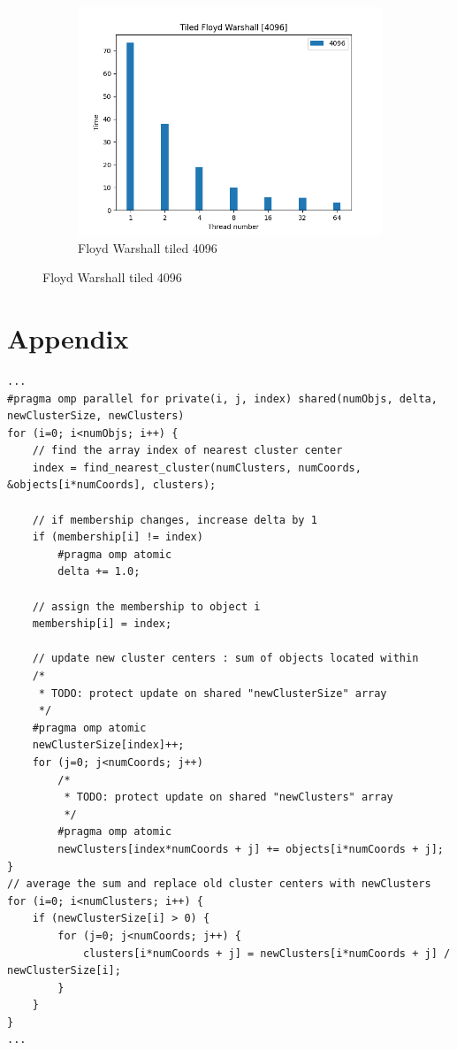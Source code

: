 \documentclass{article}
\newcommand{\eng}[1]{#1}
\begin{document}
\begin{figure}[h]
    \begin{subfigure}{0.49\textwidth}
        \includegraphics[width=\textwidth]{a2/plots/fw_tiled_4096.png}
        \caption{\eng{Floyd Warshall tiled} 4096}
        \label{fig:fw_tiled_4096}
    \end{subfigure}
\end{figure}

\clearpage
\section{Appendix}

\begin{lstlisting}[caption={Naive Kmeans Shared Clusters}, style=CStyle, label={lst:kmeans-shared-clusters}]
...
#pragma omp parallel for private(i, j, index) shared(numObjs, delta, newClusterSize, newClusters)
for (i=0; i<numObjs; i++) {
    // find the array index of nearest cluster center 
    index = find_nearest_cluster(numClusters, numCoords, &objects[i*numCoords], clusters);

    // if membership changes, increase delta by 1 
    if (membership[i] != index)
        #pragma omp atomic
        delta += 1.0;

    // assign the membership to object i 
    membership[i] = index;

    // update new cluster centers : sum of objects located within 
    /*
     * TODO: protect update on shared "newClusterSize" array
     */
    #pragma omp atomic 
    newClusterSize[index]++;
    for (j=0; j<numCoords; j++)
        /*
         * TODO: protect update on shared "newClusters" array
         */
        #pragma omp atomic 
        newClusters[index*numCoords + j] += objects[i*numCoords + j];
}
// average the sum and replace old cluster centers with newClusters 
for (i=0; i<numClusters; i++) {
    if (newClusterSize[i] > 0) {
        for (j=0; j<numCoords; j++) {
            clusters[i*numCoords + j] = newClusters[i*numCoords + j] / newClusterSize[i];
        }
    }
}
... 
\end{lstlisting}
\end{document}
